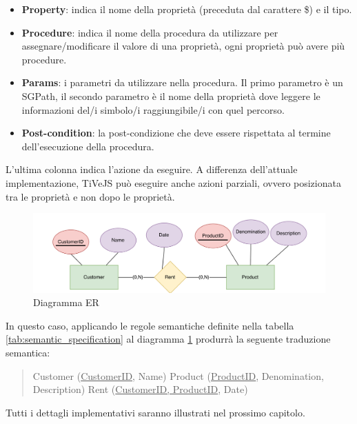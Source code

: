         \begin{itemize}
            \item \textbf{Property}: indica il nome della proprietà (preceduta dal carattere \$) e il tipo.
            \item \textbf{Procedure}: indica il nome della procedura da utilizzare per assegnare/modificare il valore di una proprietà, ogni proprietà può avere più procedure.
            \item \textbf{Params}: i parametri da utilizzare nella procedura. Il primo parametro è un SGPath, il secondo parametro è il nome della proprietà dove leggere le informazioni del/i simbolo/i raggiungibile/i con quel percorso.
            \item \textbf{Post-condition}: la post-condizione che deve essere rispettata al termine dell'esecuzione della procedura. 
        \end{itemize}
        L'ultima colonna indica l'azione da eseguire. A differenza dell'attuale implementazione, TiVeJS può eseguire anche azioni parziali, ovvero posizionata tra le proprietà e non dopo le proprietà.
        \newline
        \begin{figure}[htbp]
            \centering
            \includegraphics[scale=0.4]{Figure/er_diagram.PNG}
            \caption{Diagramma ER}
            \label{fig:er_diagram}
        \end{figure}
        In questo caso, applicando le regole semantiche definite nella tabella \ref{tab:semantic_specification} al diagramma \ref{fig:er_diagram} produrrà la seguente traduzione semantica:
        \begin{quotation}
            \noindent
            Customer (\underline{CustomerID}, Name) \newline
            Product (\underline{ProductID}, Denomination, Description) \newline
            Rent (\underline{CustomerID, ProductID}, Date)
        \end{quotation}
        Tutti i dettagli implementativi saranno illustrati nel prossimo capitolo.